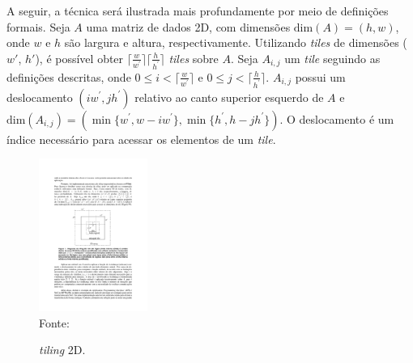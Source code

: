 
A seguir, a técnica será ilustrada mais profundamente
por meio de definições formais. Seja $A$ uma matriz de dados 2D, com dimensões
$\textrm{dim}(A) = (h,w)$, onde $w$ e $h$ são largura e altura, respectivamente.
Utilizando \textit{tiles} de dimensões ($w'$, $h'$), é possível obter
$\lceil\frac{w}{w^\prime}\rceil\lceil\frac{h}{h^\prime}\rceil$ \textit{tiles}
sobre $A$. Seja $A_{i,j}$ um \textit{tile} seguindo as definições descritas,
onde $0 \leq i < \lceil\frac{w}{w^\prime}\rceil$ e $0\leq j <
\lceil\frac{h}{h^\prime}\rceil$. $A_{i,j}$ possui um deslocamento $(i
w^\prime, j h^\prime)$ relativo ao canto superior esquerdo de $A$ e
$\textrm{dim}(A_{i,j}) = (\min\{w^\prime, w-i w^\prime\}, \min\{h^\prime, h-j
h^\prime\})$. O deslocamento é um índice necessário para
acessar os elementos de um \textit{tile}.

\begin{figure}[t]
  \begin{minipage}[b]{0.9\textwidth}
	\centering
    \caption{\textit{tiling} 2D.}
    \includegraphics[height=5cm]{figs/tile.pdf} \\
    Fonte:~\cite{rocha17}
	\label{fig:block2d}
  \end{minipage}
\end{figure}

